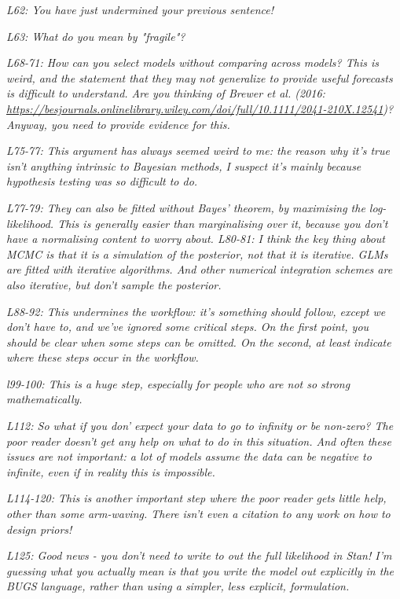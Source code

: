\documentclass[11pt,a4paper]{article}
\begin{document}
\emph{L62: You have just undermined your previous sentence!}

\emph{L63: What do you mean by "fragile"?}

\emph{L68-71: How can you select models without comparing across models? This is weird, and the statement that they may not generalize to provide useful forecasts is difficult to understand. Are you thinking of Brewer et al. (2016: \url{https://besjournals.onlinelibrary.wiley.com/doi/full/10.1111/2041-210X.12541})? Anyway, you need to provide evidence for this.}

\emph{L75-77: This argument has always seemed weird to me: the reason why it's true isn't anything intrinsic to Bayesian methods, I suspect it's mainly because hypothesis testing was so difficult to do.}

\emph{L77-79: They can also be fitted without Bayes' theorem, by maximising the log-likelihood. This is generally easier than marginalising over it, because you don't have a normalising content to worry about.
L80-81: I think the key thing about MCMC is that it is a simulation of the posterior, not that it is iterative. GLMs are fitted with iterative algorithms. And other numerical integration schemes are also iterative, but don't sample the posterior.}

\emph{L88-92: This undermines the workflow: it's something should follow, except we don't have to, and we've ignored some critical steps. On the first point, you should be clear when some steps can be omitted. On the second, at least indicate where these steps occur in the workflow.}

\emph{l99-100: This is a huge step, especially for people who are not so strong mathematically.}

\emph{L112: So what if you don' expect your data to go to infinity or be non-zero? The poor reader doesn't get any help on what to do in this situation. And often these issues are not important: a lot of models assume the data can be negative to infinite, even if in reality this is impossible.}

\emph{L114-120: This is another important step where the poor reader gets little help, other than some arm-waving. There isn't even a citation to any work on how to design priors!}

\emph{L125: Good news - you don't need to write to out the full likelihood in Stan! I'm guessing what you actually mean is that you write the model out explicitly in the BUGS language, rather than using a simpler, less explicit, formulation.}
\end{document}
